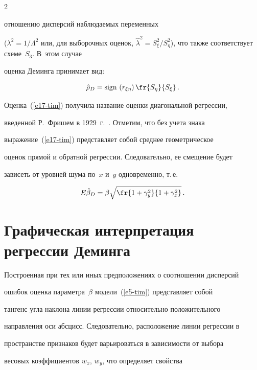 \begin{multicols}{2}
\begin{enumerate}[1.]
отношению дисперсий наблюдаемых переменных

($\lambda^2=1/\Lambda^2$ или, для выборочных оценок, $\hat{\lambda}^2

=S^2_\xi/S^2_\eta$), что также соответствует схеме~$S_3$. В~этом случае

оценка Деминга принимает вид:

\begin{equation}

\hat{\rho}_D =\mathrm{sign}\, \left( r_{\xi\eta}\right) \fr{S_\eta}{S_\xi}\,.

\label{e17-tim}

\end{equation}



  Оценка~(\ref{e17-tim}) получила название оценки диагональной регрессии,

введенной Р.~Фришем в 1929~г.~\cite{11-tim}. Отметим, что без учета знака

выражение~(\ref{e17-tim}) представляет собой среднее гео\-мет\-ри\-че\-ское

оценок прямой и обратной регрессии. Следовательно, ее смещение будет

зависеть от уровней шума по~$x$ и~$y$ одновременно, т.\,е.

  $$

  E\hat{\beta}_D =  \beta  \sqrt{\fr{1+\gamma_y^2}{1+\gamma^2_x}}\,.

  $$

\end{enumerate}



\section{Графическая интерпретация регрессии Деминга}



  Построенная при тех или иных предположениях о соотношении дисперсий

ошибок оценка па\-ра\-мет\-ра~$\beta$ модели~(\ref{e5-tim}) представляет собой

тангенс угла наклона линии регрессии относительно положительного

направления оси абсцисс. Следовательно, расположение линии регрессии в

пространстве признаков будет варьироваться в зависимости от выбора

весовых коэффициентов $w_x$, $w_y$, что определяет свойства


\end{multicols}
